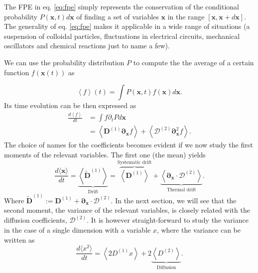 \documentclass[ twoside,openright,titlepage,numbers=noenddot,%
headinclude,footinclude,cleardoublepage=empty,abstract=on,
BCOR=5mm,paper=a4,fontsize=11pt, dvipsnames
]{scrreprt}
\renewcommand{\vec}[1]{\bm{#1}}
\newcommand{\tens}[1]{\bm{\mathcal{#1}}}
\begin{document}
%
The \gls{FPE} in eq. \eqref{eq:fpe} simply represents the conservation of the conditional probability $P(\vec{x},t)d\vec{x}$ of finding a set of variables $\vec{x}$ in the range $[\vec{x}, \vec{x} + d\vec{x}]$. The generality of eq. \eqref{eq:fpe} makes it applicable in a wide range of situations (a suspension of colloidal particles, fluctuations in electrical circuits, mechanical oscillators and chemical reactions just to name a few).

We can use the probability distribution $P$ to compute the the average of a certain function $f(\vec{x}(t))$ as

\begin{equation}
  \left\langle f\right\rangle(t) = \int {P(\vec{x},t) f(\vec{x}) d\vec{x}}.
\end{equation}
Its time evolution can be then expressed as
\begin{equation}
  \begin{aligned}
    \frac{d\left\langle f\right\rangle}{dt} &= \int{f\partial_tPd\vec{x}}\\
    &= \left\langle \vec{D}^{(1)} \vec{\partial}_{\vec{x}}f\right\rangle + \left\langle \tens{D}^{(2)}\vec\partial_{\vec{x}}^2f\right\rangle.
  \end{aligned}
\end{equation}
The choice of names for the coefficients becomes evident if we now study the first moments of the relevant variables. The first one (the mean) yields
\begin{equation}
  \label{eq:fpemean}  
  \frac{d\langle\vec{x}\rangle}{dt} = \underbrace{\left\langle \widetilde{\vec{D}}^{(1)}\right\rangle}_{\text{Drift}} = \overbrace{\left\langle \vec{D}^{(1)}\right\rangle}^{\text{Systematic drift}} + \underbrace{\left\langle \vec{\partial}_{\vec{x}}\cdot\tens{D}^{(2)}\right\rangle}_{\text{Thermal drift}}.
\end{equation}
Where $\widetilde{\vec{D}}^{(1)} := \vec{D}^{(1)} + \vec{\partial}_{\vec{x}}\cdot\tens{D}^{(2)}$.
In the next section, we will see that the second moment, the variance of the relevant variables, is closely related with the diffusion coefficients, $\tens{D}^{(2)}$. It is however straight-forward to study the variance in the case of a single dimension with a variable $x$, where the variance can be written as
\begin{equation}
  \label{eq:fpevar}
  \frac{d\langle x^2\rangle}{dt} = \left\langle 2 D^{(1)}x\right\rangle + 2\underbrace{\left\langle D^{(2)}\right\rangle}_{\text{Diffusion}}.
\end{equation}
\end{document}
